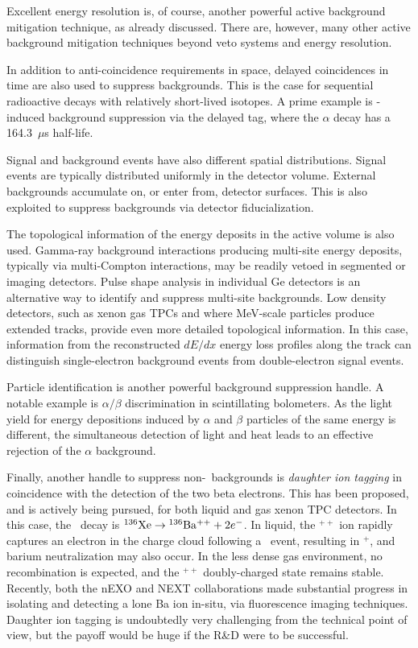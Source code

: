 Excellent energy resolution is, of course, another powerful active background mitigation technique, as already discussed. There are, however, many other active background mitigation techniques beyond veto systems and energy resolution. 

In addition to anti-coincidence requirements in space, delayed coincidences in time are also used to suppress backgrounds. This is the case for sequential radioactive decays with relatively short-lived isotopes. A prime example is -induced background suppression via the delayed  tag, where the  $\alpha$ decay has a 164.3~$\mu$s half-life. 

Signal and background events have also different spatial distributions. Signal events are typically distributed uniformly in the detector volume. External backgrounds accumulate on, or enter from, detector surfaces. This is also exploited to suppress backgrounds via detector fiducialization. 

The topological information of the energy deposits in the active volume is also used. Gamma-ray background interactions producing multi-site energy deposits, typically via multi-Compton interactions, may be readily vetoed in segmented or imaging detectors. Pulse shape analysis in individual Ge detectors is an alternative way to identify and suppress multi-site backgrounds. Low density detectors, such as xenon gas TPCs and where MeV-scale particles produce extended tracks, provide even more detailed topological information. In this case, information from the reconstructed $dE/dx$ energy loss profiles along the track can distinguish single-electron background events from double-electron signal events.

Particle identification is another powerful background suppression handle. A notable example is $\alpha/\beta$ discrimination in scintillating bolometers. As the light yield for energy depositions induced by $\alpha$ and $\beta$ particles of the same energy is different, the simultaneous detection of light and heat leads to an effective rejection of the $\alpha$ background. 

Finally, another handle to suppress non-\bbtnu\ backgrounds is \emph{daughter ion tagging} in coincidence with the detection of the two beta electrons. This has been proposed, and is actively being pursued, for both liquid and gas xenon TPC detectors. In this case, the \bbonu\ decay is ${\rm ^{136}Xe}\to {\rm ^{136}Ba^{++}}+2e^-$. In liquid, the $^{++}$ ion rapidly captures an electron in the charge cloud following a \bb\ event, resulting in $^{+}$, and barium neutralization may also occur. In the less dense gas environment, no recombination is expected, and the $^{++}$ doubly-charged state remains stable. Recently, both the nEXO \cite{nEXO:2018nxx} and NEXT \cite{McDonald:2017izm,Rivilla:2020cvm} collaborations made substantial progress in isolating and detecting a lone Ba ion in-situ, via fluorescence imaging techniques. Daughter ion tagging is undoubtedly very challenging from the technical point of view, but the payoff would be huge if the R\&D were to be successful.

